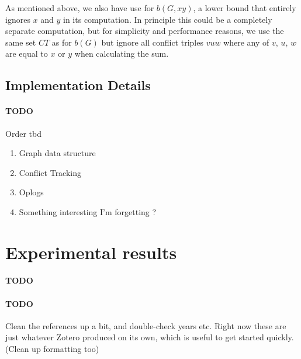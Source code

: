 \documentclass{article}
\newcommand{\todo}[1]{\paragraph{TODO} #1}
\theoremstyle{definition}
\begin{document}
As mentioned above, we also have use for $b(G, xy)$, a lower bound that entirely ignores $x$ and $y$
in its computation. In principle this could be a completely separate computation, but for simplicity
and performance reasons, we use the same set $CT$ as for $b(G)$ but ignore all conflict triples $vuw$
where any of $v$, $u$, $w$ are equal to $x$ or $y$ when calculating the sum.

\subsection{Implementation Details} \label {ImplDetails}

\todo Order tbd
\begin{enumerate}
	\item Graph data structure
	\item Conflict Tracking
	\item Oplogs
	\item Something interesting I'm forgetting ?
\end{enumerate}


\section{Experimental results}

\todo

\todo Clean the references up a bit, and double-check years etc. Right now these are just whatever
Zotero produced on its own, which is useful to get started quickly. (Clean up formatting too)
\end{document}
